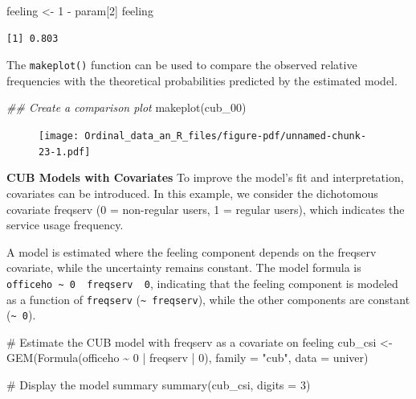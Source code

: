 \documentclass[
  letterpaper,
  DIV=11,
  numbers=noendperiod]{scrartcl}
\newenvironment{Shaded}{\begin{snugshade}}{\end{snugshade}}
\newcommand{\AttributeTok}[1]{\textcolor[rgb]{0.40,0.45,0.13}{#1}}
\newcommand{\CommentTok}[1]{\textcolor[rgb]{0.37,0.37,0.37}{#1}}
\newcommand{\DecValTok}[1]{\textcolor[rgb]{0.68,0.00,0.00}{#1}}
\newcommand{\DocumentationTok}[1]{\textcolor[rgb]{0.37,0.37,0.37}{\textit{#1}}}
\newcommand{\FunctionTok}[1]{\textcolor[rgb]{0.28,0.35,0.67}{#1}}
\newcommand{\NormalTok}[1]{\textcolor[rgb]{0.00,0.23,0.31}{#1}}
\newcommand{\OtherTok}[1]{\textcolor[rgb]{0.00,0.23,0.31}{#1}}
\newcommand{\SpecialCharTok}[1]{\textcolor[rgb]{0.37,0.37,0.37}{#1}}
\newcommand{\StringTok}[1]{\textcolor[rgb]{0.13,0.47,0.30}{#1}}
\begin{document}
\begin{Shaded}
\begin{Highlighting}[]
\NormalTok{feeling }\OtherTok{\textless{}{-}} \DecValTok{1} \SpecialCharTok{{-}}\NormalTok{ param[}\DecValTok{2}\NormalTok{]}
\NormalTok{feeling}
\end{Highlighting}
\end{Shaded}

\begin{verbatim}
[1] 0.803
\end{verbatim}

The \texttt{makeplot()} function can be used to compare the observed
relative frequencies with the theoretical probabilities predicted by the
estimated model.

\begin{Shaded}
\begin{Highlighting}[]
\DocumentationTok{\#\# Create a comparison plot}
\FunctionTok{makeplot}\NormalTok{(cub\_00)}
\end{Highlighting}
\end{Shaded}

\begin{figure}[H]

{\centering \texttt{[image: Ordinal\_data\_an\_R\_files/figure-pdf/unnamed-chunk-23-1.pdf]}

}

\end{figure}

\textbf{CUB Models with Covariates} To improve the model's fit and
interpretation, covariates can be introduced. In this example, we
consider the dichotomous covariate freqserv (0 = non-regular users, 1 =
regular users), which indicates the service usage frequency.

A model is estimated where the feeling component depends on the freqserv
covariate, while the uncertainty remains constant. The model formula is
\texttt{officeho\ \textasciitilde{}\ 0\ \textbar{}\ freqserv\ \textbar{}\ 0},
indicating that the feeling component is modeled as a function of
\texttt{freqserv} (\texttt{\textasciitilde{}\ freqserv}), while the
other components are constant (\texttt{\textasciitilde{}\ 0}).

\begin{Shaded}
\begin{Highlighting}[]
\CommentTok{\# Estimate the CUB model with freqserv as a covariate on feeling}
\NormalTok{cub\_csi }\OtherTok{\textless{}{-}} \FunctionTok{GEM}\NormalTok{(}\FunctionTok{Formula}\NormalTok{(officeho }\SpecialCharTok{\textasciitilde{}} \DecValTok{0} \SpecialCharTok{|}\NormalTok{ freqserv }\SpecialCharTok{|} \DecValTok{0}\NormalTok{), }\AttributeTok{family =} \StringTok{"cub"}\NormalTok{, }\AttributeTok{data =}\NormalTok{ univer)}

\CommentTok{\# Display the model summary}
\FunctionTok{summary}\NormalTok{(cub\_csi, }\AttributeTok{digits =} \DecValTok{3}\NormalTok{)}
\end{Highlighting}
\end{Shaded}
\end{document}
